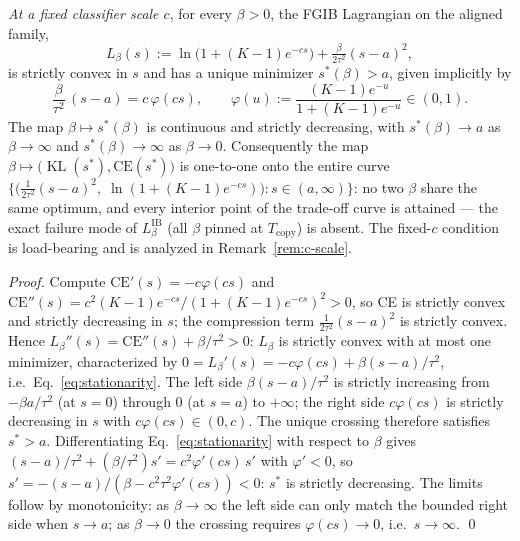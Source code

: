 \begin{proposition}\label{prop:sweep}
\emph{At a fixed classifier scale $c$}, for every $\beta > 0$, the FGIB Lagrangian on
the aligned family,
\begin{equation}
L_\beta(s) := \ln\!\big(1 + (K-1)e^{-cs}\big) + \tfrac{\beta}{2\tau^2}(s-a)^2,
\label{eq:fgib-lag}
\end{equation}
is strictly convex in $s$ and has a unique minimizer $s^*(\beta) > a$, given implicitly
by
\begin{equation}
\frac{\beta}{\tau^2}\,(s-a) = c\,\varphi(cs),
\qquad
\varphi(u) := \frac{(K-1)e^{-u}}{1 + (K-1)e^{-u}} \in (0,1) .
\label{eq:stationarity}
\end{equation}
The map $\beta \mapsto s^*(\beta)$ is continuous and strictly decreasing, with
$s^*(\beta) \to a$ as $\beta \to \infty$ and $s^*(\beta) \to \infty$ as $\beta \to 0$.
Consequently the map $\beta \mapsto \big(\operatorname{KL}(s^*), \mathrm{CE}(s^*)\big)$
is one-to-one onto the entire curve
$\{\big(\tfrac{1}{2\tau^2}(s-a)^2,\; \ln(1+(K-1)e^{-cs})\big) : s \in (a, \infty)\}$:
no two
$\beta$ share the same optimum, and every interior point of the trade-off curve is
attained --- the exact failure mode of $L^{\mathrm{IB}}_\beta$ (all $\beta$ pinned at
$T_{\mathrm{copy}}$) is absent. The fixed-$c$ condition is load-bearing and is analyzed
in Remark~\ref{rem:c-scale}.
\end{proposition}

\begin{proof}
Compute $\mathrm{CE}'(s) = -c\varphi(cs)$ and
$\mathrm{CE}''(s) = c^2 (K-1) e^{-cs}/(1 + (K-1)e^{-cs})^2 > 0$, so CE is strictly
convex and strictly decreasing in $s$; the compression term $\tfrac{1}{2\tau^2}(s-a)^2$
is strictly convex. Hence $L_\beta''(s) = \mathrm{CE}''(s) + \beta/\tau^2 > 0$:
$L_\beta$ is
strictly convex with at most one minimizer, characterized by
$0 = L_\beta'(s) = -c\varphi(cs) + \beta(s-a)/\tau^2$, i.e.\
Eq.~\eqref{eq:stationarity}.
The left side $\beta(s-a)/\tau^2$ is strictly increasing from $-\beta a/\tau^2$
(at $s=0$) through $0$
(at $s=a$) to $+\infty$; the right side $c\varphi(cs)$ is strictly decreasing in $s$
with $c\varphi(cs) \in (0, c)$. The unique crossing therefore satisfies $s^* > a$.
Differentiating Eq.~\eqref{eq:stationarity} with respect to $\beta$ gives
$(s-a)/\tau^2 + (\beta/\tau^2) s' = c^2\varphi'(cs)\,s'$ with $\varphi' < 0$, so
$s' = -(s-a)/(\beta - c^2\tau^2\varphi'(cs)) < 0$: $s^*$ is strictly decreasing.
The limits follow by monotonicity: as $\beta \to \infty$ the left side can only match
the bounded right side when $s \to a$; as $\beta \to 0$ the crossing requires
$\varphi(cs)\to 0$, i.e.\ $s \to \infty$. \hfill\qed
\end{proof}

